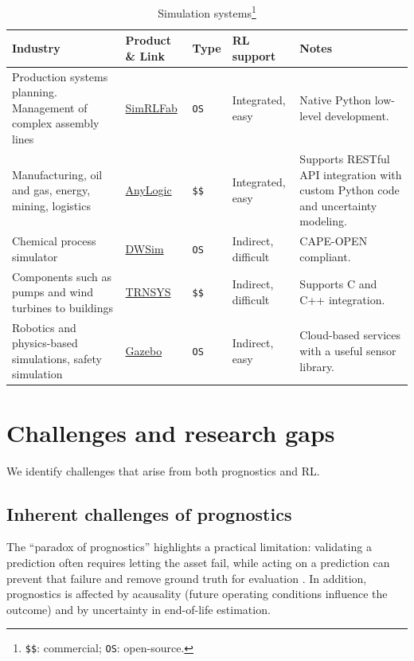 \documentclass[12pt,oneside]{book}
\renewcommand{\arraystretch}{1.5}
\begin{document}
\begin{table}[!htbp]
	\renewcommand\arraystretch{1.5}
	\begin{center}
		\begin{minipage}{\textwidth}
			\caption[Simulation systems]{Simulation systems\protect\footnote{\texttt{\$\$}: commercial; \texttt{OS}: open-source.}}\label{tbl:SimulationSystems}
			\begin{tabular}{@{}L{4.5cm} L{2cm} L{1.25cm} L{1.75cm} L{5cm}@{}}
				\toprule
				\textbf{Industry} & \textbf{Product \& Link} & \textbf{Type} & \textbf{RL support} & \textbf{Notes}\\
				\midrule				
				Production systems planning. Management of complex assembly lines & \href{https://github.com/AndreasKuhnle/SimRLFab}{SimRLFab} & \texttt{OS} & Integrated, easy & Native Python low-level development.\\
				Manufacturing, oil and gas, energy, mining, logistics & \href{https://www.anylogic.com/}{AnyLogic} & \texttt{\$\$} & Integrated, easy & Supports RESTful API integration with custom Python code and uncertainty modeling.\\
				Chemical process simulator & \href{https://dwsim.fossee.in/}{DWSim} & \texttt{OS} & Indirect, difficult & CAPE-OPEN compliant.\\
				Components such as pumps and wind turbines to buildings & \href{http://www.trnsys.com/}{TRNSYS} & \texttt{\$\$} & Indirect, difficult & Supports C and C++ integration.\\
				Robotics and physics-based simulations, safety simulation & \href{https://gazebosim.org/home}{Gazebo} & \texttt{OS} & Indirect, easy & Cloud-based services with a useful sensor library.\\
				\bottomrule
			\end{tabular}
		\end{minipage}
	\end{center}
\end{table}

\section{Challenges and research gaps}\label{sec:slr-challenges}
We identify challenges that arise from both prognostics and RL.

\subsection{Inherent challenges of prognostics}
The ``paradox of prognostics'' highlights a practical limitation: validating a prediction often requires letting the asset fail, while acting on a prediction can prevent that failure and remove ground truth for evaluation \citep{Saxena2010evaluating}. In addition, prognostics is affected by acausality (future operating conditions influence the outcome) and by uncertainty in end-of-life estimation.
\end{document}
